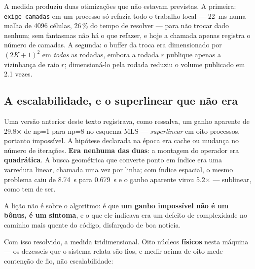 A medida produziu duas otimizações que não estavam previstas. A primeira:
\texttt{exige\_camadas} em um processo só refazia todo o trabalho local --- 
\SI{22}{\milli\second} numa malha de \num{4096} células, 26\,\% do tempo de
resolver --- para não trocar dado nenhum; sem fantasmas não há o que refazer, e
hoje a chamada apenas registra o número de camadas. A segunda: o buffer da troca
era dimensionado por $(2K+1)^2$ em \emph{todas} as rodadas, embora a rodada $r$
publique apenas a vizinhança de raio $r$; dimensioná-lo pela rodada reduziu o
volume publicado em \num{2.1} vezes.

\subsection{A escalabilidade, e o superlinear que não era}
\label{sec:par-escala}

Uma versão anterior deste texto registrava, como ressalva, um ganho aparente de
\num{29.8}$\times$ de np=1 para np=8 no esquema MLS --- \emph{superlinear} em
oito processos, portanto impossível. A hipótese declarada na época era cache ou
mudança no número de iterações. \textbf{Era nenhuma das duas}: a montagem do
operador era \textbf{quadrática}. A busca geométrica que converte ponto em
índice era uma varredura linear, chamada uma vez por linha; com índice espacial,
o mesmo problema caiu de \SI{8.74}{\second} para \SI{0.679}{\second} e o ganho
aparente virou \num{5.2}$\times$ --- sublinear, como tem de ser.

A lição não é sobre o algoritmo: é que \textbf{um ganho impossível não é um
bônus, é um sintoma}, e o que ele indicava era um defeito de complexidade no
caminho mais quente do código, disfarçado de boa notícia.

Com isso resolvido, a medida tridimensional. Oito núcleos \textbf{físicos} nesta
máquina --- os dezesseis que o sistema relata são fios, e medir acima de oito
mede contenção de fio, não escalabilidade:

